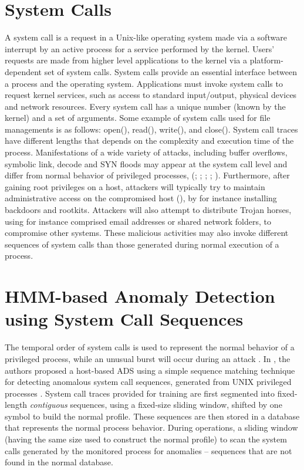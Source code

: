 \section{System Calls}
\label{sec:system-calls}
A system call is a request in a Unix-like operating system made via a software interrupt by an active process for a service performed by the kernel.
Users' requests are made from higher level applications  to the kernel via a platform-dependent set of system calls. System calls provide an essential interface between a process and the operating system. Applications must invoke system calls to request kernel services, such as access to standard input/output, physical devices and network resources. Every system call has a unique number (known by the kernel) and a set of arguments. Some example of system calls used for file managements is as follows: open(), read(), write(), and close(). System call traces have different lengths that depends on the complexity and execution time of the process.
Manifestations of a wide variety of attacks, including buffer overflows, symbolic link, decode and SYN floods may appear at the system call level and differ from normal behavior of privileged processes, (\cite{Forrest1996}; \cite{Hofmeyr1998}; \cite{Kosoresow1997}; \cite{Somaayaji2002}; \cite{Warrender1999}). Furthermore, after gaining root privileges on a host, attackers will typically try to maintain administrative access on the compromised host (\cite{Mitnick2005}), by for instance installing backdoors and rootkits. Attackers will also attempt to distribute Trojan horses, using for instance comprised email addresses or shared network folders, to compromise other systems. These malicious activities may also invoke different sequences of system calls than those generated during normal execution of a process.

\section{HMM-based Anomaly Detection using System Call Sequences}
\label{sec:ads-hmm}


The temporal order of system calls is used to represent the normal behavior of a privileged process, while an unusual burst will occur during an attack \cite{Forrest1996,Warrender1999}.
In \cite{Forrest1996,Warrender1999}, the authors proposed a host-based ADS using a simple sequence matching technique for detecting anomalous system call sequences, generated from UNIX privileged processes \cite{Forrest1996}.
System call traces provided for training are first segmented into fixed-length \textit{contiguous} sequences, using a fixed-size sliding window, shifted by one symbol to build the normal profile.
These sequences are then stored in a database that represents the normal process behavior.
During operations, a sliding window (having the same size used to construct the normal profile) to scan the system calls generated by the monitored process for anomalies -- sequences that are not found in the normal database.

